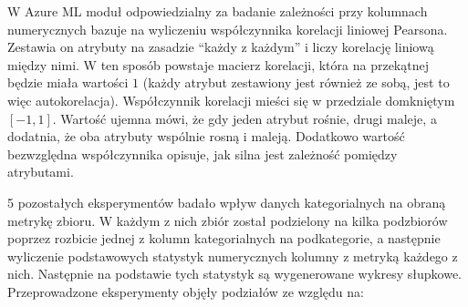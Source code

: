 W Azure ML moduł odpowiedzialny za badanie zależności przy kolumnach numerycznych bazuje na wyliczeniu współczynnika korelacji liniowej Pearsona.
Zestawia on atrybuty na zasadzie ``każdy z każdym'' i liczy korelację liniową między nimi.
W ten sposób powstaje macierz korelacji, która na przekątnej będzie miała wartości \( 1 \) (każdy atrybut zestawiony jest również ze sobą, jest to więc autokorelacja).
Współczynnik korelacji mieści się w przedziale domkniętym \( [-1, 1] \).
Wartość ujemna mówi, że gdy jeden atrybut rośnie, drugi maleje, a dodatnia, że oba atrybuty wspólnie rosną i maleją.
Dodatkowo wartość bezwzględna współczynnika opisuje, jak silna jest zależność pomiędzy atrybutami.

5 pozostałych eksperymentów badało wpływ danych kategorialnych na obraną metrykę zbioru.
W każdym z nich zbiór został podzielony na kilka podzbiorów poprzez rozbicie jednej z kolumn kategorialnych na podkategorie, a następnie wyliczenie podstawowych statystyk numerycznych kolumny z metryką każdego z nich.
Następnie na podstawie tych statystyk są wygenerowane wykresy słupkowe.
Przeprowadzone eksperymenty objęły podziałów ze względu na:

